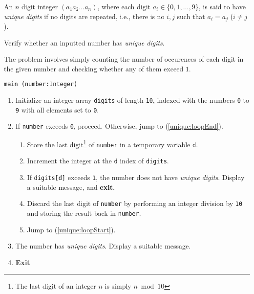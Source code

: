 

\problem An $n$ digit integer $(a_1a_2\dots a_n)$, where each digit $a_i \in \{0, 1, \dots, 9\}$,
is said to have {\em unique digits} if no digits are repeated, i.e., there is no $i, j$ such that $a_i = a_j$ ($i \neq j$).

Verify whether an inputted number has {\em unique digits}.

\solution The problem involves simply counting the number of occurences of each digit in the given number and checking whether any of them exceed $1$.

\algorithm
{\tt main (number:Integer)}
\begin{enumerate}
	\item	Initialize an integer array {\tt digits} of length {\tt 10}, indexed with the numbers {\tt 0} to {\tt 9} with all
			elements set to {\tt 0}.
	\item	If {\tt number} exceeds {\tt 0}, proceed.
			Otherwise, jump to (\ref{unique:loopEnd}). \label{unique:loopStart}
	\begin{enumerate}
		\item	Store the last digit\footnote{The last digit of an integer $n$ is simply $n \bmod 10$}
				of {\tt number} in a temporary variable {\tt d}.
		\item	Increment the integer at the {\tt d} index of {\tt digits}.
		\item	If {\tt digits[d]} exceeds {\tt 1}, the number does not have {\em unique digits}. Display a suitable
				message, and {\bf exit}.
		\item	Discard the last digit of {\tt number} by performing an integer division by {\tt 10} and storing
				the result back in {\tt number}.
		\item	Jump to (\ref{unique:loopStart}).
	\end{enumerate}
	\item	The number has {\em unique digits}. Display a suitable message. \label{unique:loopEnd}
	\item	{\bf Exit}
\end{enumerate}

\sourcecode
